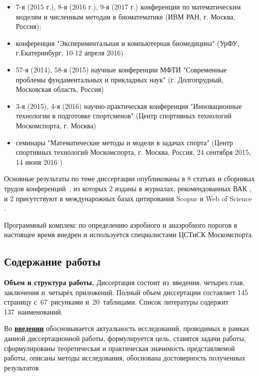 \noindent
\begin{itemize}
  
  \item 7-я (2015 г.), 8-я (2016 г.), 9-я (2017 г.) конференции по математическим моделям и численным методам в биоматематике (ИВМ РАН, г. Москва, Россия); 
  
  \item конференция "Экспериментальная и компьютерная биомедицина" (УрФУ, г.Екатеринбург, 10-12 апреля 2016)
  
  \item 57-я (2014), 58-я (2015) научные конференции МФТИ "Современные проблемы фундаментальных и прикладных наук" (г. Долгопрудный, Московская область, Россия)
  
  \item 3-я (2015), 4-я (2016) научно-практическая конференция "Инновационные технологии в подготовке спортсменов" (Центр спортивных технологий Москомспорта, г. Москва)
  
  \item семинары "Математические методы и модели в задачах спорта" (Центр спортивных технологий Москомспорта, г. Москва, Россия, 24 сентября 2015, 14 июня 2016 )
\end{itemize}

Основные результаты по теме диссертации опубликованы в 8 статьях и сборниках трудов конференций~\cite{GolovComp2017, GolovCmodel2017, GolovIt2017,GolovSp2015,GolovSp2016,TimmeSp2016,GolovEkb2016,Simakov2015}, из которых 2 изданы в журналах, рекомендованных ВАК \cite{GolovIt2017, GolovCmodel2017}, и 2 присутствуют в междунарожных базах цитирования Scopus и Web of Science \cite{GolovComp2017, GolovCmodel2017}.

Программный комплекс по определению аэробного и анаэробного порогов в настоящее время внедрен и используется специалистами ЦСТиСК Москомспорта.

 
\subsection*{\Large Содержание работы}

\textbf{Объем и структура работы.} Диссертация состоит из~введения, четырех глав, заключения и~четырёх приложений. Полный объем диссертации составляет 145 страницу с~67~рисунками и~20~таблицами. Список литературы содержит 137~наименований.

Во \underline{\textbf{введении}} обосновывается актуальность исследований, проводимых в рамках данной диссертационной работы,  формулируется цель, ставятся задачи работы, сформулированы теоретическая и практическая значимость представляемой работы, описаны методы исследования, обоснована достоверность полученных результатов 

